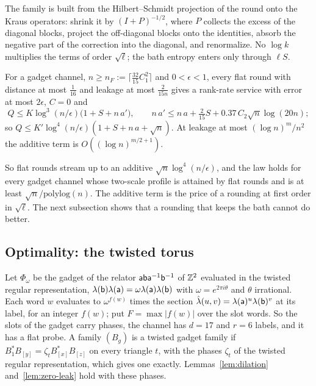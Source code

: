 The family is built from the Hilbert--Schmidt projection of the round onto the Kraus operators: shrink it by $(I+P)^{-1/2}$, where $P$
collects the excess of the diagonal blocks, project the off-diagonal blocks onto the identities, absorb the negative part of the correction
into the diagonal, and renormalize. No $\log k$ multiplies the terms of order $\sqrt\ell$; the bath entropy enters only through $\ell S$.

\begin{corollary}\label{cor:F}
For a gadget channel, $n\ge n_F:=\lceil\frac{32}{15}C_1^2\rceil$ and $0<\epsilon<1$, every flat round with distance at most $\frac1{16}$ and leakage
at most $\frac2{15n}$ gives a rank-rate service with error at most $2\epsilon$, $C=0$ and
\[
Q\le K\log^3(n/\epsilon)\bigl(1+S+n\,a'\bigr),\qquad n\,a'\le n\,a+\tfrac2{15}S+0.37\,C_2\sqrt n\log(20n);
\]
so $Q\le K'\log^4(n/\epsilon)(1+S+n\,a+\sqrt n)$. At leakage at most $(\log n)^m/n^2$ the additive term is $O((\log n)^{m/2+1})$.
\end{corollary}

So flat rounds stream up to an additive $\sqrt n\log^4(n/\epsilon)$, and the law holds for every gadget channel whose two-scale profile is attained by
flat rounds and is at least $\sqrt n/\mathrm{polylog}(n)$. The additive term is the price of a rounding at first order in $\sqrt\ell$. The next
subsection shows that a rounding that keeps the bath cannot do better.

\subsection{Optimality: the twisted torus}\label{sec:twisted}

Let $\Phi_\omega$ be the gadget of the relator $\mathsf a\mathsf b\mathsf a^{-1}\mathsf b^{-1}$ of $\mathbb Z^2$ evaluated in the twisted regular representation,
$\lambda(\mathsf b)\lambda(\mathsf a)=\omega\lambda(\mathsf a)\lambda(\mathsf b)$ with $\omega=e^{2\pi i\theta}$ and $\theta$ irrational. Each word $w$ evaluates to
$\omega^{f(w)}$ times the section $\hat\lambda(u,v)=\lambda(\mathsf a)^u\lambda(\mathsf b)^v$ at its label, for an integer $f(w)$; put $F=\max|f(w)|$ over the slot
words. So the slots of the gadget carry phases, the channel has $d=17$ and $r=6$ labels, and it has a flat probe. A family $(B_g)$ is a twisted gadget family if
$B_1^*B_{[y]}=\zeta_tB_{[x]}^*B_{[z]}$ on every triangle $t$, with the phases $\zeta_t$ of the twisted regular representation, which gives one
exactly. Lemmas~\ref{lem:dilation} and~\ref{lem:zero-leak} hold with these phases.

